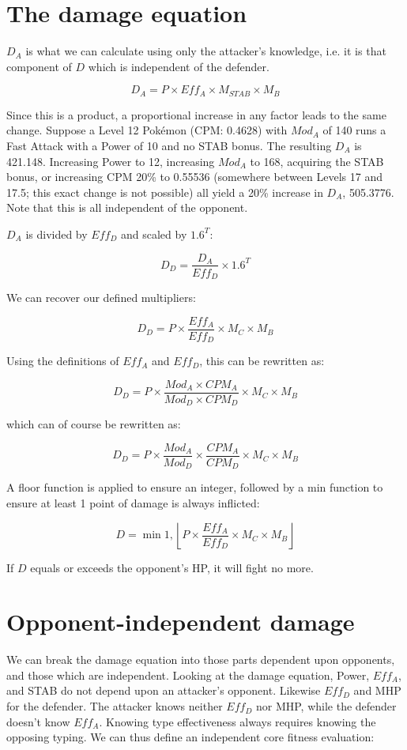 \section{The damage equation}
\label{sec:damage}

$D_A$ is what we can calculate using only the attacker's knowledge, i.e.
 it is that component of $D$ which is independent of the defender.

\[ D_A = P \times Eff_A \times M_{STAB} \times M_B \]

Since this is a product, a proportional increase in any factor leads to
 the same change.
Suppose a Level 12 Pokémon (CPM: 0.4628) with $Mod_A$ of 140 runs
  a Fast Attack with a Power of 10 and no STAB bonus.
The resulting $D_A$ is 421.148.
Increasing Power to 12,
 increasing $Mod_A$ to 168,
 acquiring the STAB bonus,
 or increasing CPM 20\% to 0.55536 (somewhere between Levels 17 and 17.5; this exact change is not possible)
 all yield a 20\% increase in $D_A$, 505.3776.
Note that this is all independent of the opponent.

$D_A$ is divided by $Eff_D$ and scaled by $1.6^T$:

\[ D_D = \frac{D_A}{Eff_D} \times 1.6^T \]

We can recover our defined multipliers:

\[ D_D = P \times \frac{Eff_A}{Eff_D} \times M_C \times M_B \]

Using the definitions of $Eff_A$ and $Eff_D$, this can be rewritten as:

\[ D_D = P \times \frac{Mod_A \times CPM_A}{Mod_D \times CPM_D} \times M_C \times M_B \]

which can of course be rewritten as:

\[ D_D = P \times \frac{Mod_A}{Mod_D} \times \frac{CPM_A}{CPM_D} \times M_C \times M_B \]

A floor function is applied to ensure an integer,
 followed by a min function to ensure at least 1 point of damage is always inflicted:

\[ D = \min{1, \left\lfloor P \times \frac{Eff_A}{Eff_D} \times M_C \times M_B \right\rfloor } \]

If $D$ equals or exceeds the opponent's HP, it will fight no more.

\section{Opponent-independent damage}
We can break the damage equation into those parts dependent
 upon opponents, and those which are independent.
Looking at the damage equation, Power, $Eff_A$, and STAB do not depend
 upon an attacker's opponent.
Likewise $Eff_D$ and MHP for the defender.
The attacker knows neither $Eff_D$ nor MHP, while the defender doesn't know $Eff_A$.
Knowing type effectiveness always requires knowing the opposing typing.
We can thus define an independent core fitness evaluation:


